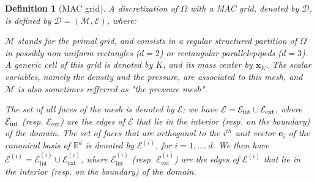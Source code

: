 \documentclass{amsart}
\newtheorem{df}{Definition}
\numberwithin{equation}{section}
\begin{document}
\begin{df}[MAC grid]
\label{def:MACgrid}
A discretization of $\Omega$ with a MAC grid, denoted by $\mathcal{D}$, is defined by $\mathcal{D} = ({{\mathcal M}}, {{\mathcal E}})$,
where:
\begin{list}{-}{\itemsep=0.ex \topsep=0.5ex    }
\item ${{\mathcal M}}$ stands for the primal grid, and consists in a regular structured partition of $\Omega$ in possibly non uniform rectangles ($d=2$) or rectangular parallelepipeds ($d=3$).
A generic cell of this grid is denoted by $K$, and its mass center by ${{\boldsymbol x}}_K$.
The scalar variables, namely the density and the pressure, are associated to this mesh, and ${{\mathcal M}}$ is also sometimes refferred as "the pressure mesh".

\item The set of all faces of the mesh is denoted by ${{\mathcal E}}$; we have ${{\mathcal E}}= {{\mathcal E}_{\rm int}} \cup {{\mathcal E}_{\mathrm{ext}}}$, where ${{\mathcal E}_{\rm int}}$ (resp. ${{\mathcal E}_{\mathrm{ext}}}$) are the edges of ${{\mathcal E}}$ that lie in the interior (resp. on the boundary) of the domain.  
The set of faces that are orthogonal to the $i^{th}$ unit vector ${{\boldsymbol e}}_{i}$ of the canonical basis of $\mathbb{R}^d$ is denoted by ${\mathcal {E}^{(i)}}$, for $i = 1,\ldots,d$.
We then have ${\mathcal {E}^{(i)}}= {{\mathcal E}_{\mathrm{int}}^{(i)}} \cup {{\mathcal E}_{\mathrm{ext}}^{(i)}}$, where ${{\mathcal E}_{\mathrm{int}}^{(i)}}$  (resp. ${{\mathcal E}_{\mathrm{ext}}^{(i)}}$) are the edges of ${\mathcal {E}^{(i)}}$ that lie in the interior (resp. on the boundary) of the domain.


\end{list}
\end{df}
\end{document}
